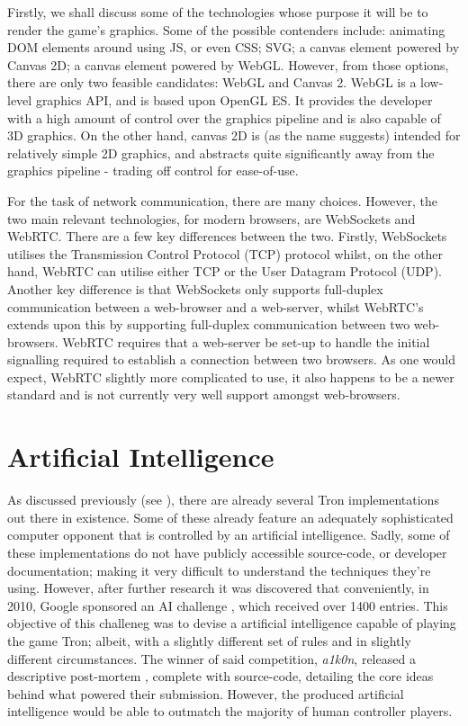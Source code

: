 \documentclass[class=article, crop=false]{standalone}
\begin{document}
		Firstly, we shall discuss some of the technologies whose purpose it will be to render the game's graphics. Some of the possible contenders include: animating DOM elements around using JS, or even CSS; SVG; a canvas element powered by Canvas 2D; a canvas element powered by WebGL. However, from those options, there are only two feasible candidates: WebGL and Canvas 2. WebGL is a low-level graphics API, and is based upon OpenGL ES. It provides the developer with a high amount of control over the graphics pipeline and is also capable of 3D graphics. On the other hand, canvas 2D is (as the name suggests) intended for relatively simple 2D graphics, and abstracts quite significantly away from the graphics pipeline - trading off control for ease-of-use.

		For the task of network communication, there are many choices. However, the two main relevant technologies, for modern browsers, are WebSockets and WebRTC. There are a few key differences between the two. Firstly, WebSockets utilises the Transmission Control Protocol (TCP) protocol whilst, on the other hand, WebRTC can utilise either TCP or the User Datagram Protocol (UDP). Another key difference is that WebSockets only supports full-duplex communication between a web-browser and a web-server, whilst WebRTC's extends upon this by supporting full-duplex communication between two web-browsers. WebRTC requires that a web-server be set-up to handle the initial signalling required to establish a connection between two browsers. As one would expect, WebRTC slightly more complicated to use, it also happens to be a newer standard and is not currently very well support amongst web-browsers.

	\section{Artificial Intelligence} \label{sec:background-google-ai}
		As discussed previously (see ), there are already several Tron implementations out there in existence. Some of these already feature an adequately sophisticated computer opponent that is controlled by an artificial intelligence. Sadly, some of these implementations do not have publicly accessible source-code, or developer documentation; making it very difficult to understand the techniques they're using. However, after further research it was discovered that conveniently, in 2010, Google sponsored an AI challenge \parencite{GoogleTronAi}, which received over 1400 entries. This objective of this challeneg was to devise a artificial intelligence capable of playing the game Tron; albeit, with a slightly different set of rules and in slightly different circumstances. The winner of said competition, \emph{a1k0n}, released a descriptive post-mortem \parencite{TronPostMortem}, complete with source-code, detailing the core ideas behind what powered their submission. However, the produced artificial intelligence would be able to outmatch the majority of human controller players.
\end{document}
